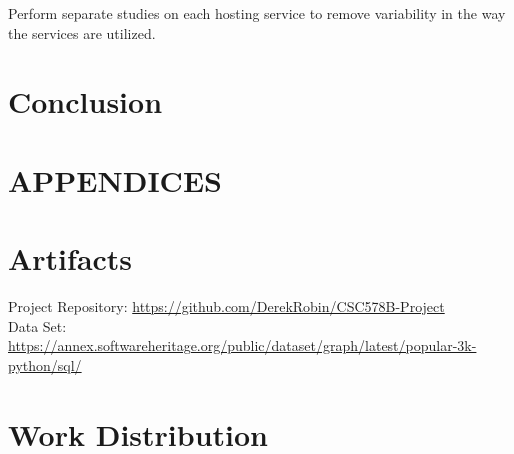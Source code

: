 \documentclass[acmconf]{acmart}
\begin{document}
Perform separate studies on each hosting service to remove variability in the way the services are utilized.


\section{Conclusion} \label{conclusion}




\appendix
\section*{APPENDICES}
\section{Artifacts} \label{artifacts}

Project Repository: \url{https://github.com/DerekRobin/CSC578B-Project}\\
Data Set: \url{https://annex.softwareheritage.org/public/dataset/graph/latest/popular-3k-python/sql/}

\section{Work Distribution}
\end{document}
